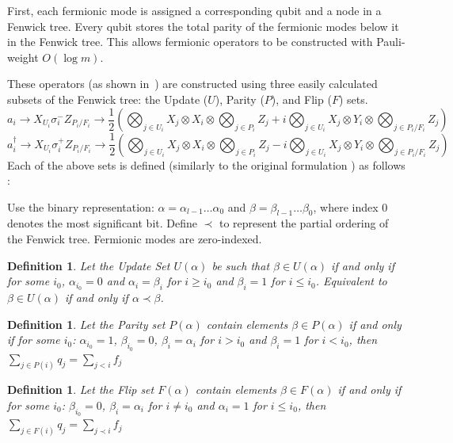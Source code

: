 \documentclass[pdftex,pra,aps,twocolumn,twoside]{revtex4-2}
\theoremstyle{plain}
\newtheorem{definition}[theorem]{Definition}
\theoremstyle{note}
\newcommand\+{{\footnotesize \raisebox{0.3ex}{+}}}
\begin{document}
First, each fermionic mode is assigned a corresponding qubit and a node in a Fenwick tree. Every qubit stores the total parity of the fermionic modes below it in the Fenwick tree. This allows fermionic operators to be constructed with Pauli-weight $O(\log m)$.

These operators (as shown in~\cite{seeley2012bravyi}) are constructed using three easily calculated subsets of the Fenwick tree: the Update ($U$), Parity ($P$), and Flip ($F$)  sets.
\begin{dmath*}
a_i \rightarrow X_{U_i}  \sigma^-_i  Z_{ P_i/F_i} \rightarrow \frac{1}{2}\left( \bigotimes_{j \in U_i} X_j \otimes X_i \otimes \bigotimes_{j \in P_i} Z_j + i \bigotimes_{j \in U_i} X_j \otimes Y_i\otimes \bigotimes_{j \in P_i/F_i} Z_j \right)
\end{dmath*}
\begin{dmath*}
a^{\dagger}_i \rightarrow X_{U_i}  \sigma^+_iZ_{ P_i/F_i} \rightarrow \frac{1}{2}\left( \bigotimes_{j \in U_i} X_j \otimes X_i \otimes \bigotimes_{j \in P_i} Z_j - i \bigotimes_{j \in U_i} X_j \otimes Y_i\otimes \bigotimes_{j \in  P_i/F_i} Z_j \right) 
\end{dmath*}
Each of the above sets is defined (similarly to the original formulation \cite{seeley2012bravyi}) as follows :

Use the binary representation: $\alpha = \alpha_{l-1}\ldots \alpha_0$ and $\beta = \beta_{l-1}\ldots \beta_0$, where index $0$ denotes the most significant bit. Define $\prec$ to represent the partial ordering of the Fenwick tree. Fermionic modes are zero-indexed.

\begin{definition} Let the Update Set $U(\alpha)$ be such that $\beta \in U(\alpha)$ if and only if for some $i_0$, $\alpha_{i_0} = 0$ and $\alpha_i = \beta_i$ for $i\geq i_0$ and $\beta_i = 1$ for $i \leq i_0$. Equivalent to $\beta \in U(\alpha)$ if and only if $\alpha \prec \beta$.
\end{definition}

\begin{definition} Let the Parity set $P(\alpha)$ contain elements $\beta \in P(\alpha)$ if and only if for some $i_0$: $\alpha_{i_0} = 1$, $\beta_{i_0} = 0$, $\beta_i = \alpha_i$ for $i> i_0$ and $\beta_i = 1$ for $i< i_0$, then $
        \sum_{j \in P(i)} q_j = \sum_{j < i} f_j$
\end{definition}

\begin{definition} Let the Flip set $F(\alpha)$ contain elements $\beta \in F(\alpha)$ if and only if for some $i_0$: $\beta_{i_0} = 0$, $\beta_i = \alpha_i$ for $i\neq i_0$ and $\alpha_i = 1$ for $i\leq i_0$, then $
 \sum_{j \in F(i)} q_j = \sum_{j \prec i} f_j$
\end{definition}
\end{document}
